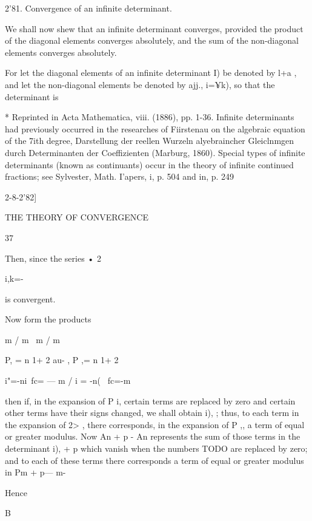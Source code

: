 2'81. Convergence of an infinite determinant. 

We shall now shew that an infinite determinant converges, provided the product of the 
diagonal elements converges absolutely, and the sum of the non-diagonal elements converges 
absolutely. 

For let the diagonal elements of an infinite determinant I) be denoted by l+a , 
and let the non-diagonal elements be denoted by ajj.,  i=¥k), so that the determinant is 

* Reprinted in Acta Mathematica, viii. (1886), pp. 1-36. Infinite determinants had previously 
occurred in the researches of Fiirstenau on the algebraic equation of the 7ith degree, Darstellung 
der reellen Wurzeln alyebraincher Gleiclnmgen durch Determinanten der Coeffizienten (Marburg, 
1860). Special types of infinite determinants (known as continuants) occur in the theory of 
infinite continued fractions; see Sylvester, Math. I'apers, i, p. 504 and in, p. 249 



2-8-2'82] 



THE THEORY OF CONVERGENCE 



37 




Then, since the series • 2 

i,k=- 



is convergent. 

Now form the products 

m / m \ m / m 

P, = n 1+ 2 au- , P ,= n 1+ 2 

i"=-ni\ fc= — m / i = -n( \ fc=-m 

then if, in the expansion of P i, certain terms are replaced by zero and certain other 
terms have their signs changed, we shall obtain i),  ; thus, to each term in the expansion 
of 2> , there corresponds, in the expansion of P ,, a term of equal or greater modulus. 
Now An + p - An represents the sum of those terms in the determinant i),  + p which vanish 
when the numbers TODO are replaced by zero; and to each of 
these terms there corresponds a term of equal or greater modulus in Pm + p— m- 



Hence 



B  



